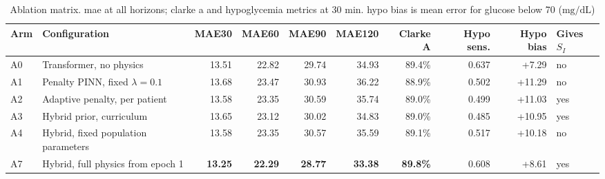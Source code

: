 \documentclass[journal]{IEEEtran}
\begin{document}
\begin{table}[t]
\centering

\caption{Ablation matrix. mae at all horizons; clarke a and hypoglycemia metrics at 30 min. hypo bias is mean error for glucose below 70 ($\mathrm{mg/dL}$)}
\label{tab:ablation}
\footnotesize
\setlength{\tabcolsep}{4.5pt}
\begin{tabular}{llrrrrrrrl}
\toprule
Arm & Configuration & MAE30 & MAE60 & MAE90 & MAE120 & Clarke A & Hypo sens. & Hypo bias & Gives $S_I$ \\
\midrule
A0 & Transformer, no physics & 13.51 & 22.82 & 29.74 & 34.93 & 89.4\% & 0.637 & +7.29 & no \\
A1 & Penalty PINN, fixed $\lambda=0.1$ & 13.68 & 23.47 & 30.93 & 36.22 & 88.9\% & 0.502 & +11.29 & no \\
A2 & Adaptive penalty, per patient & 13.58 & 23.35 & 30.59 & 35.74 & 89.0\% & 0.499 & +11.03 & yes \\
A3 & Hybrid prior, curriculum & 13.65 & 23.12 & 30.02 & 34.83 & 89.0\% & 0.485 & +10.95 & yes \\
A4 & Hybrid, fixed population parameters & 13.58 & 23.35 & 30.57 & 35.59 & 89.1\% & 0.517 & +10.18 & no \\
A7 & Hybrid, full physics from epoch 1 & \textbf{13.25} & \textbf{22.29} & \textbf{28.77} & \textbf{33.38} & \textbf{89.8\%} & 0.608 & +8.61 & yes \\
\bottomrule
\end{tabular}
\end{table}

\tabA
{}\tabB
{}\tabC
{}\tabD
{}\tabE
{}\tabF
{}\of\tabA \global\let\ablA=\pgfplotsretval
{}\of\tabB \global\let\ablB=\pgfplotsretval
{}\of\tabC \global\let\ablC=\pgfplotsretval
{}\of\tabD \global\let\ablD=\pgfplotsretval
{}\of\tabE \global\let\ablE=\pgfplotsretval
{}\of\tabF \global\let\ablF=\pgfplotsretval
\end{document}
